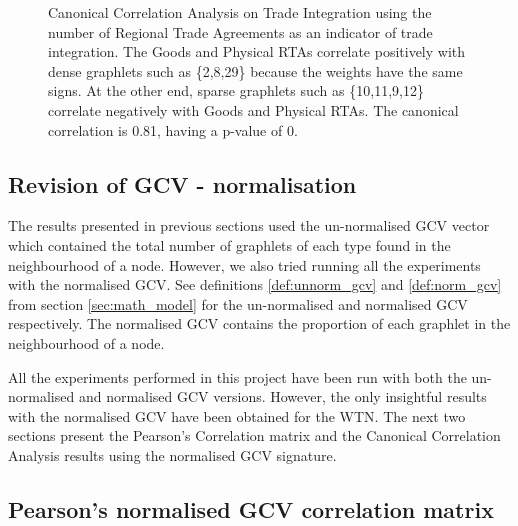 \begin{figure}
\begin{subfigure}{.25\textwidth}
    \gten
    \geleven
    \gnine
    \gdots
    \gtwentynine
    \geight
    \gtwo

  \end{subfigure}
  
\caption[CCA - World Trade Network - Regional Trade Agreements]{Canonical Correlation Analysis on Trade Integration using the number of Regional Trade Agreements as an indicator of trade integration. The Goods and Physical RTAs correlate positively with dense graphlets such as \{2,8,29\} because the weights have the same signs. At the other end, sparse graphlets such as \{10,11,9,12\} correlate negatively with Goods and Physical RTAs. The canonical correlation is 0.81, having a p-value of 0.}
\label{trade_integ_rtas}
\end{figure}


\subsection{Revision of GCV - normalisation}

The results presented in previous sections used the un-normalised GCV vector which contained the total number of graphlets of each type found in the neighbourhood of a node. However, we also tried running all the experiments with the normalised GCV. See definitions \ref{def:unnorm_gcv} and \ref{def:norm_gcv} from section \ref{sec:math_model} for the un-normalised and normalised GCV respectively. The normalised GCV contains the proportion of each graphlet in the neighbourhood of a node. 

All the experiments performed in this project have been run with both the un-normalised and normalised GCV versions. However, the only insightful results with the normalised GCV have been obtained for the WTN. The next two sections present the Pearson's Correlation matrix and the Canonical Correlation Analysis results using the normalised GCV signature.

\subsection{Pearson's normalised GCV correlation matrix}
\label{sec:trade_pears_norm1}

